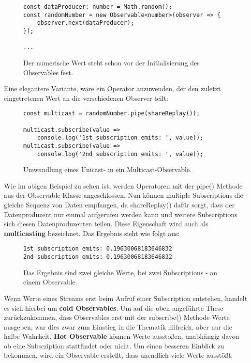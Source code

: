 \begin{figure}[H]
\begin{lstlisting}[basicstyle=\small]
const dataProducer: number = Math.random();
const randomNumber = new Observable<number>(observer => {
    observer.next(dataProducer);
});

...
\end{lstlisting}
\caption{Der numerische Wert steht schon vor der Initialisierung des Observables fest.}
\end{figure}

\noindent
Eine elegantere Variante, wäre ein Operator anzuwenden, der den zuletzt eingetretenen Wert an die verschiedenen Observer teilt:

\begin{figure}[H]
\begin{lstlisting}[basicstyle=\small]
const multicast = randomNumber.pipe(shareReplay());

multicast.subscribe(value =>
    console.log('1st subscription emits: ', value));
multicast.subscribe(value =>
    console.log('2nd subscription emits: ', value));
\end{lstlisting}
\caption{Umwandlung eines Unicast- in ein Multicast-Observable.}
\label{unicast-transformation}
\end{figure}

\noindent
Wie im obigen Beispiel zu sehen ist, werden Operatoren mit der pipe() Methode aus der Observable Klasse angeschlossen. Nun können multiple Subscriptions die gleiche Sequenz von Daten empfangen, da shareReplay() dafür sorgt, dass der Datenproduzent nur einmal aufgerufen werden kann und weitere Subscriptions sich diesen Datenproduzenten teilen. Diese Eigenschaft wird auch als \textbf{multicasting} bezeichnet. Das Ergebnis sieht wie folgt aus:

\begin{figure}[H]
\begin{lstlisting}
1st subscription emits: 0.19630068183646832
2nd subscription emits: 0.19630068183646832
\end{lstlisting}
\caption{Das Ergebnis sind zwei gleiche Werte, bei zwei Subscriptions - an einem Observable.}
\end{figure}

\noindent
Wenn Werte eines Streams erst beim Aufruf einer Subscription entstehen, handelt es sich hierbei um \textbf{cold Observables}\cite{hot-vs-cold}. Um auf die oben angeführte These zurückzukommen, dass Observables erst mit der subscribe() Methode Werte ausgeben, war dies zwar zum Einstieg in die Thematik hilfreich, aber nur die halbe Wahrheit. \textbf{Hot Observable} können Werte ausstoßen, unabhängig davon ob eine Subscription stattfindet oder nicht. Um einen besseren Einblick zu bekommen, wird ein Observable erstellt, dass unendlich viele Werte ausstößt.

